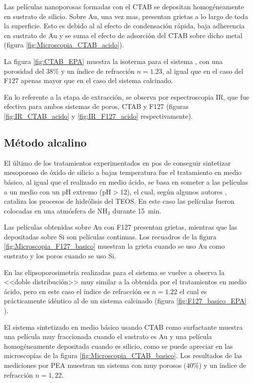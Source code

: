 		 Las películas nanoporosas formadas con el CTAB se depositan homogéneamente en sustrato de silicio. Sobre Au, una vez mas, presentan grietas a lo largo de toda la superficie. Esto es debido al al efecto de condensación rápida, baja adherencia en sustrato de Au y se suma el efecto de adsorción del CTAB sobre dicho metal (figura \ref{fig:Microscopia_CTAB_acido}). 

		 La figura \ref{fig:CTAB_EPA} muestra la isoterma para el sistema \pdmC, con una porosidad del 38\% y un índice de refracción $n=1.23$, al igual que en el caso del F127 apenas mayor que en el caso del sistema calcinado.
		
		 En lo referente a la etapa de extracción, se observa por espectroscopia IR, que fue efectiva para ambos sistemas de poros, CTAB y F127 (figuras \ref{fig:IR_CTAB_acido} y \ref{fig:IR_F127_acido} respectivamente).	
				
	 \subsection{Método alcalino}

	 	 El último de los tratamientos experimentados en pos de conseguir sintetizar mesoporoso de óxido de silicio a bajas temperatura fue el tratamiento en medio básico, al igual que el realizado en medio ácido, se basa en someter a las películas a un medio con un pH extremo (pH$>12$), el cual, según algunos autores \cite{Soler-Illia2011,Huo1996,Ichinose2002}, cataliza los procesos de hidrólisis del TEOS. En este caso las películas fueron colocadas en una atmósfera de NH$_3$ durante \SI{15}{\minute}. 

		 Las películas obtenidas sobre Au con F127 presentan grietas, mientras que las depositadas sobre Si son películas continuas. Los recuadros de la figura \ref{fig:Microscopia_F127_basico} muestran la grieta cuando se uso Au como sustrato y los poros cuando se uso Si.

		 En las elipsoporosimetría realizadas para el sistema \pdmF\space se vuelve a observa la <<doble distribución>> muy similar a la obtenida por el tratamientos en medio ácido, pero en este caso el índice de refracción es $n=1.22$ el cual es prácticamente idéntico al de un sistema calcinado (figura \ref{fig:F127_basico_EPA} ).

		 El sistema sintetizado en medio básico usando CTAB como surfactante muestra una película muy fraccionada cuando el sustrato es Au y una película homogéneamente depositada cuando es silicio, como se puede apreciar en las microscopías de la figura \ref{fig:Microscopia_CTAB_basico}. Los resultados de las mediciones por PEA muestran un sistema con muy porosos ($40\%$) y un índice de refracción $n=1,22$.
	
